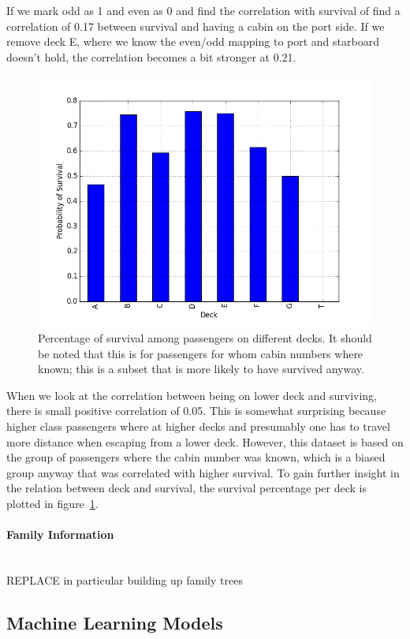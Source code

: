 \documentclass{llncs}
\begin{document}
If we mark odd as 1 and even as 0 and find the correlation with survival of find a correlation of 0.17 between survival and having a cabin on the port side. If we remove deck E, where we know the even/odd mapping to port and starboard doesn't hold, the correlation becomes a bit stronger at 0.21.
\begin{figure}[H]
    \includegraphics[width=\linewidth]{survival_per_deck}
    \caption{Percentage of survival among passengers on different decks. It should be noted that this is for passengers for whom cabin numbers where known; this is a subset that is more likely to have survived anyway.}
    \label{fig:survival_per_deck}
\end{figure}
\noindent
When we look at the correlation between being on lower deck and surviving, there is small positive correlation of 0.05. This is somewhat surprising because higher class passengers where at higher decks and presumably one has to travel more distance when escaping from a lower deck. However, this dataset is based on the group of passengers where the cabin number was known, which is a biased group anyway that was correlated with higher survival. To gain further insight in the relation between deck and survival, the survival percentage per deck is plotted in figure~\ref{fig:survival_per_deck}.

\paragraph{Family Information}~\\
REPLACE in particular building up family trees
\subsection{Machine Learning Models}
\label{subsec:titanic_machine_learning_models}
\end{document}
